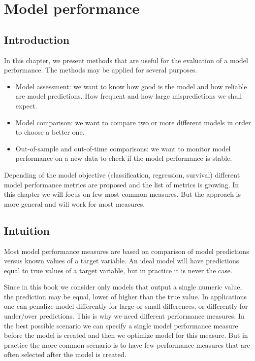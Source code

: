 \documentclass[12pt,]{krantz}
\providecommand{\tightlist}{%
  \setlength{\itemsep}{0pt}\setlength{\parskip}{0pt}}
\begin{document}
\hypertarget{modelPerformance}{%
\section{Model performance}\label{modelPerformance}}

\hypertarget{modelPerformanceIntro}{%
\subsection{Introduction}\label{modelPerformanceIntro}}

In this chapter, we present methods that are useful for the evaluation of a model performance. The methods may be applied for several purposes.

\begin{itemize}
\tightlist
\item
  Model assessment: we want to know how good is the model and how reliable are model predictions. How frequent and how large mispredictions we shall expect.
\item
  Model comparison: we want to compare two or more different models in order to choose a better one.
\item
  Out-of-sample and out-of-time comparisons: we want to monitor model performance on a new data to check if the model performance is stable.
\end{itemize}

Depending of the model objective (classification, regression, survival) different model performance metrics are proposed and the list of metrics is growing. In this chapter we will focus on few most common measures. But the approach is more general and will work for most measures.

\hypertarget{modelPerformanceIntuition}{%
\subsection{Intuition}\label{modelPerformanceIntuition}}

Most model performance measures are based on comparison of model predictions versus known values of a target variable. An ideal model will have predictions equal to true values of a target variable, but in practice it is never the case.

Since in this book we consider only models that output a single numeric value, the prediction may be equal, lower of higher than the true value. In applications one can penalize model differently for large or small differences, or differently for under/over predictions. This is why we need different performance measures.
In the best possible scenario we can specify a single model performance measure before the model is created and then we optimize model for this measure. But in practice the more common scenario is to have few performance measures that are often selected after the model is created.
\end{document}
